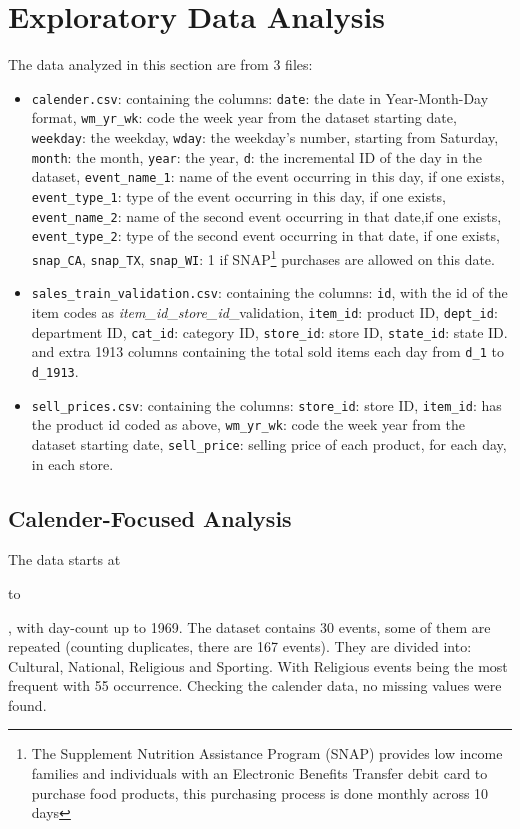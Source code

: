 \documentclass[12pt]{article}
\begin{document}
\clearpage
\section{Exploratory Data Analysis}
The data analyzed in this section are from 3 files: \begin{itemize}
    \item \texttt{calender.csv}: containing the columns: \texttt{date}: the date in Year-Month-Day format, \texttt{wm\_yr\_wk}: code the week year from the dataset starting date, \texttt{weekday}: the weekday, \texttt{wday}: the weekday's number, starting from Saturday, \texttt{month}: the month, \texttt{year}: the year, \texttt{d}: the incremental ID of the day in the dataset, \texttt{event\_name\_1}: name of the event occurring in this day, if one exists, \texttt{event\_type\_1}: type of the event occurring in this day, if one exists, \texttt{event\_name\_2}: name of the second event occurring in that date,if one exists, \texttt{event\_type\_2}: type of the second event occurring in that date, if one exists, \texttt{snap\_CA}, \texttt{snap\_TX}, \texttt{snap\_WI}: 1 if SNAP\footnote{The Supplement Nutrition 
    Assistance Program (SNAP) provides low income families and individuals with an Electronic Benefits Transfer 
    debit card to purchase food products, this purchasing process is done monthly across 10 days} purchases are allowed on this date.
    \item \texttt{sales\_train\_validation.csv}: containing the columns: \texttt{id}, with the id of the item codes as \textit{item\_id}\_\textit{store\_id}\_validation, \texttt{item\_id}: product ID, \texttt{dept\_id}: department ID,
    \texttt{cat\_id}: category ID, \texttt{store\_id}: store ID, \texttt{state\_id}: state ID. and extra 1913 columns containing the total sold items each day from \texttt{d\_1} to \texttt{d\_1913}.
    \item \texttt{sell\_prices.csv}: containing the columns: \texttt{store\_id}: store ID, \texttt{item\_id}: has the product id coded as above, \texttt{wm\_yr\_wk}: code the week year from the dataset starting date, \texttt{sell\_price}: selling price of each product, for each day, in each store.
    
\end{itemize}
\subsection{Calender-Focused Analysis}
The data starts at \date{January 29, 2011} to \date{June 19, 2016}, with day-count up to 1969. The dataset contains 30 events, some of them are repeated (counting duplicates, there are 167 events). They are divided into: Cultural, National, Religious and Sporting. With Religious events being the most frequent with 55 occurrence. Checking the calender data, no missing values were found.
\end{document}
